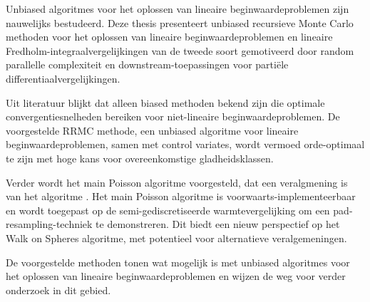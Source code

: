 Unbiased algoritmes voor het oplossen van lineaire beginwaardeproblemen zijn
nauwelijks bestudeerd.
Deze thesis presenteert unbiased recursieve Monte Carlo methoden
voor het oplossen van lineaire beginwaardeproblemen en lineaire Fredholm-integraalvergelijkingen
van de tweede soort gemotiveerd door random
parallelle complexiteit en downstream-toepassingen voor partiële differentiaalvergelijkingen.

Uit literatuur blijkt dat alleen biased methoden  bekend zijn die optimale convergentiesnelheden bereiken
voor niet-lineaire beginwaardeproblemen.
De voorgestelde RRMC methode, een unbiased algoritme voor lineaire beginwaardeproblemen,
samen met control variates, wordt vermoed orde-optimaal te zijn met hoge kans
voor overeenkomstige gladheidsklassen.

Verder wordt het main Poisson algoritme voorgesteld, dat een veralgmening is van het algoritme \cite{acebron_monte_2016}.
Het main Poisson algoritme is voorwaarts-implementeerbaar en wordt toegepast op de semi-gediscretiseerde
warmtevergelijking om een pad-resampling-techniek te demonstreren. Dit biedt een nieuw perspectief op
het Walk on Spheres algoritme,
met potentieel voor alternatieve veralgemeningen.

De voorgestelde methoden tonen
wat mogelijk is met unbiased algoritmes voor
het oplossen van lineaire beginwaardeproblemen
en wijzen de weg voor verder onderzoek in dit gebied.